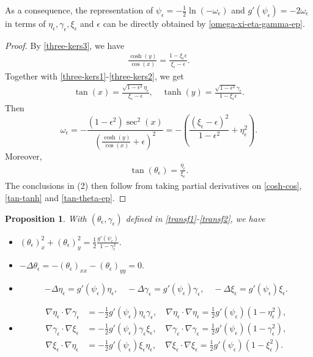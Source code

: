 \documentclass[1 [leqno, 11pt]{amsart}
\numberwithin{equation}{section}
\let\ep=\epsilon
\newtheorem{proposition}[Theorem]{Proposition}
\begin{document}
\begin{CJK*}{GBK}{song}
As a consequence, the representation of $\psi_\ep = - \frac 1 2 \ln(-\omega_\ep)$ and $ g'(\psi_\ep) = -2\omega_\ep$ in terms of $\eta_\ep, \gamma_\ep, \xi_\ep$ and $\ep$ can be directly obtained by  \eqref{omega-xi-eta-gamma-ep}.
\begin{proof}
By \eqref{three-kers3}, we have
\begin{align}\label{cosh-cos}
\frac{\cosh(y)}{\cos(x)} = \frac{1-\xi_\ep \ep}{\xi_\ep - \ep}.
\end{align}
Together with \eqref{three-kers1}-\eqref{three-kers2},
we get
\begin{align}\label{tan-tanh}
\tan(x) = \frac{\sqrt{1-\ep^2}\eta_\ep}{\xi_\ep - \ep}, \quad  \tanh(y) = \frac{\sqrt{1-\ep^2}\gamma_\ep}{1- \xi_\ep\ep}.
\end{align}
Then
$$\omega_\ep =  - \frac{(1-\ep^2) \sec^2(x)}{\left( \frac{\cosh(y)}{\cos(x)} + \ep \right)^2} = -\left(\frac{(\xi_\ep - \ep)^2}{1-\ep^2} + \eta_\ep^2\right).$$
Moreover,
\begin{align}\label{tan-theta-ep}
\tan(\theta_\ep) = \frac{\eta_\ep}{\xi_\ep}.
\end{align}
The conclusions in (2) then follow from taking partial derivatives on \eqref{cosh-cos}, \eqref{tan-tanh} and \eqref{tan-theta-ep}.
\end{proof}

\begin{proposition}\label{prop1}
With $(\theta_\ep, \gamma_\ep)$ defined in \eqref{transf1}-\eqref{transf2}, we have
\begin{itemize}
\item $(\theta_\ep)_x^2 + (\theta_\ep)_y^2 =\frac 1 2 \frac{ g'(\psi_\epsilon)}{1-\gamma_\ep^2}.$

\item $-\Delta \theta_\ep = -(\theta_\ep)_{xx} - (\theta_\ep)_{yy} = 0.$

\item $$ -\Delta \eta_\ep = g'(\psi_\epsilon) \eta_\ep, \quad
-\Delta \gamma_\ep = g'(\psi_\epsilon) \gamma_\ep, \quad
-\Delta \xi_\ep = g'(\psi_\epsilon) \xi_\ep.$$

\item \begin{align*}  \nabla \eta_\ep \cdot \nabla \gamma_\ep &= -\frac 1 2 g'(\psi_\epsilon) \eta_\ep\gamma_\ep, \quad  \nabla \eta_\ep \cdot \nabla \eta_\ep = \frac 1 2 g'(\psi_\epsilon)(1 - \eta_\ep^2),  \\
 \nabla \gamma_\ep \cdot \nabla \xi_\ep &= -\frac 1 2 g'(\psi_\epsilon) \gamma_\ep\xi_\ep, \quad \nabla \gamma_\ep \cdot \nabla \gamma_\ep = \frac 1 2 g'(\psi_\epsilon) (1 - \gamma_\ep^2 ), \\
 \nabla \xi_\ep \cdot \nabla \eta_\ep &= -\frac 1 2 g'(\psi_\epsilon) \xi_\ep\eta_\ep, \quad \nabla \xi_\ep \cdot \nabla \xi_\ep = \frac 1 2 g'(\psi_\epsilon)( 1 - \xi_\ep^2).
\end{align*}


\end{itemize}
\end{proposition}
\end{CJK*}
\end{document}
